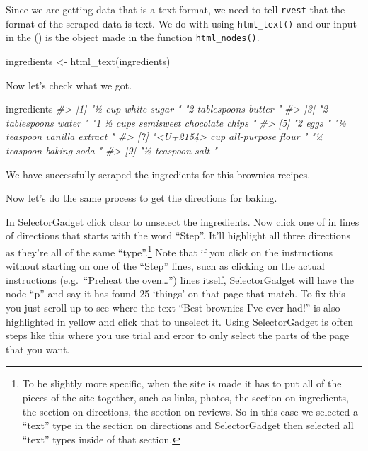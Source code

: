 \documentclass[
]{krantz}
\makeatletter
\newenvironment{Shaded}{\begin{snugshade}}{\end{snugshade}}
\newcommand{\CommentTok}[1]{\textcolor[rgb]{0.37,0.37,0.37}{\textit{#1}}}
\newcommand{\FunctionTok}[1]{\textcolor[rgb]{0,0,0}{#1}}
\newcommand{\NormalTok}[1]{#1}
\newcommand{\OtherTok}[1]{\textcolor[rgb]{0.37,0.37,0.37}{#1}}
\newenvironment{kframe}{%
\medskip{}
\setlength{\fboxsep}{.8em}
 \def\at@end@of@kframe{}%
 \ifinner\ifhmode%
  \def\at@end@of@kframe{\end{minipage}}%
  \begin{minipage}{\columnwidth}%
 \fi\fi%
 \def\FrameCommand##1{\hskip\@totalleftmargin \hskip-\fboxsep
 \colorbox{shadecolor}{##1}\hskip-\fboxsep
     \hskip-\linewidth \hskip-\@totalleftmargin \hskip\columnwidth}%
 \MakeFramed {\advance\hsize-\width
   \@totalleftmargin\z@ \linewidth\hsize
   \@setminipage}}%
 {\par\unskip\endMakeFramed%
 \at@end@of@kframe}
\renewenvironment{Shaded}{\begin{kframe}}{\end{kframe}}
\makeatother
\begin{document}
Since we are getting data that is a text format, we need to tell \texttt{rvest} that the format of the scraped data is text. We do with using \texttt{html\_text()} and our input in the () is the object made in the function \texttt{html\_nodes()}.

\begin{Shaded}
\begin{Highlighting}[]
\NormalTok{ingredients }\OtherTok{\textless{}{-}} \FunctionTok{html\_text}\NormalTok{(ingredients)}
\end{Highlighting}
\end{Shaded}

Now let's check what we got.

\begin{Shaded}
\begin{Highlighting}[]
\NormalTok{ingredients}
\CommentTok{\#\textgreater{} [1] "½ cup white sugar "                  "2 tablespoons butter "              }
\CommentTok{\#\textgreater{} [3] "2 tablespoons water "                "1 ½ cups semisweet chocolate chips "}
\CommentTok{\#\textgreater{} [5] "2 eggs "                             "½ teaspoon vanilla extract "        }
\CommentTok{\#\textgreater{} [7] "\textless{}U+2154\textgreater{} cup all{-}purpose flour "     "¼ teaspoon baking soda "            }
\CommentTok{\#\textgreater{} [9] "½ teaspoon salt "}
\end{Highlighting}
\end{Shaded}

We have successfully scraped the ingredients for this brownies recipes.

Now let's do the same process to get the directions for baking.

In SelectorGadget click clear to unselect the ingredients. Now click one of in lines of directions that starts with the word ``Step''. It'll highlight all three directions as they're all of the same ``type''.\footnote{To be slightly more specific, when the site is made it has to put all of the pieces of the site together, such as links, photos, the section on ingredients, the section on directions, the section on reviews. So in this case we selected a ``text'' type in the section on directions and SelectorGadget then selected all ``text'' types inside of that section.} Note that if you click on the instructions without starting on one of the ``Step'' lines, such as clicking on the actual instructions (e.g.~``Preheat the oven\ldots{}'') lines itself, SelectorGadget will have the node ``p'' and say it has found 25 `things' on that page that match. To fix this you just scroll up to see where the text ``Best brownies I've ever had!'' is also highlighted in yellow and click that to unselect it. Using SelectorGadget is often steps like this where you use trial and error to only select the parts of the page that you want.
\end{document}
